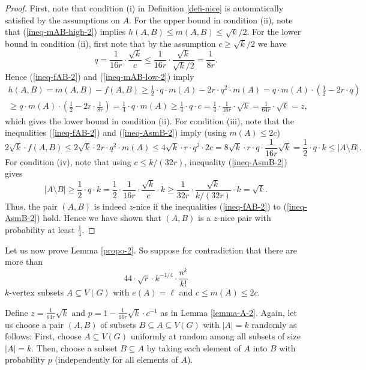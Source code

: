 \begin{proof}
First, note that condition (i) in Definition \ref{defi-nice} is automatically satisfied by the assumptions on $A$. For the upper bound in condition (ii), note that  (\ref{ineq-mAB-high-2}) implies $h(A,B)\leq m(A,B)\leq \sqrt{k}/2$. For the lower bound in condition (ii), first note that by the assumption $c\geq \sqrt{k}/2$ we have
\[q=\frac{1}{16r}\cdot \frac{\sqrt{k}}{c}\leq \frac{1}{16r}\cdot \frac{\sqrt{k}}{\sqrt{k}/2}=\frac{1}{8r}.\]
Hence (\ref{ineq-fAB-2}) and (\ref{ineq-mAB-low-2}) imply
\begin{multline*}
h(A,B)=m(A,B)-f(A,B)\geq \frac{1}{2}\cdot q \cdot m(A)-2r\cdot q^2 \cdot m(A)=q\cdot m(A)\cdot \left(\frac{1}{2}-2r\cdot q\right)\\
\geq q\cdot m(A)\cdot \left(\frac{1}{2}-2r\cdot \frac{1}{8r}\right)=\frac{1}{4}\cdot q\cdot m(A)\geq \frac{1}{4}\cdot q\cdot c=\frac{1}{4}\cdot\frac{1}{16r}\cdot \sqrt{k}=\frac{1}{64r}\cdot \sqrt{k}=z,
\end{multline*}
which gives the lower bound in condition (ii). For condition (iii), note that the inequalities (\ref{ineq-fAB-2}) and (\ref{ineq-AsmB-2}) imply (using $m(A)\leq 2c$)
\[2\sqrt{k}\cdot f(A,B)\leq 2\sqrt{k}\cdot 2r\cdot q^2 \cdot m(A)\leq 4\sqrt{k}\cdot r\cdot q^2 \cdot 2c
=8\sqrt{k}\cdot r\cdot q \cdot \frac{1}{16r}\sqrt{k}=\frac{1}{2}\cdot q \cdot k\leq \vert A\setminus B\vert.\]
For condition (iv), note that using $c\leq k/(32r)$, inequality (\ref{ineq-AsmB-2}) gives
\[\vert A\setminus B\vert\geq \frac{1}{2}\cdot q\cdot k=\frac{1}{2}\cdot \frac{1}{16r}\cdot \frac{\sqrt{k}}{c}\cdot k\geq\frac{1}{32r}\cdot \frac{\sqrt{k}}{k/(32r)}\cdot k =\sqrt{k}.\]
Thus, the pair $(A,B)$ is indeed $z$-nice if the inequalities (\ref{ineq-fAB-2}) to (\ref{ineq-AsmB-2}) hold. Hence we have shown that $(A,B)$ is a $z$-nice pair with probability at least $\frac{1}{4}$.
\end{proof}

Let us now prove Lemma \ref{propo-2}. So suppose for contradiction that there are more than
\[44\cdot \sqrt{r}\cdot k^{-1/4}\cdot \frac{n^k}{k!}\]
$k$-vertex subsets $A\subseteq V(G)$ with $e(A)=\ell$ and $c\leq m(A)\leq 2c$. 

Define $z=\frac{1}{64r}\sqrt{k}$ and $p=1-\frac{1}{16r}\sqrt{k}\cdot c^{-1}$ as in Lemma \ref{lemma-A-2}. Again, let us choose a pair $(A,B)$ of subsets $B\subseteq A\subseteq V(G)$ with $\vert A\vert=k$ randomly as follows: First, choose $A\subseteq V(G)$ uniformly at random among all subsets of size $\vert A\vert=k$. Then, choose a subset $B\subseteq A$ by taking each element of $A$ into $B$ with probability $p$ (independently for all elements of $A$).

